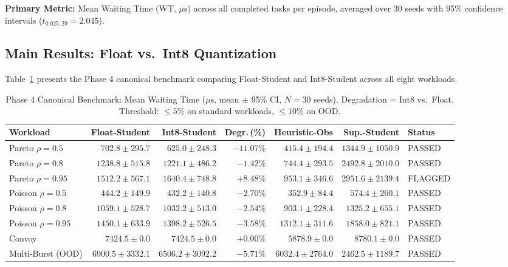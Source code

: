 \textbf{Primary Metric:} Mean Waiting Time (WT, $\mu\text{s}$) across all
completed tasks per episode, averaged over 30 seeds with 95\% confidence
intervals ($t_{0.025,29} = 2.045$).

\subsection{Main Results: Float vs.\ Int8 Quantization}
\label{subsec:main_results}

Table~\ref{tab:phase4} presents the Phase 4 canonical benchmark comparing
Float-Student and Int8-Student across all eight workloads.

\begin{table}[t]
  \centering
  \caption{Phase 4 Canonical Benchmark: Mean Waiting Time ($\mu\text{s}$,
    mean $\pm$ 95\% CI, $N = 30$ seeds). Degradation = Int8 vs.\ Float.
    Threshold: $\le 5\%$ on standard workloads, $\le 10\%$ on OOD.}
  \label{tab:phase4}
  \small
  \begin{tabular}{lrrrrrl}
    \toprule
    \textbf{Workload} & \textbf{Float-Student} & \textbf{Int8-Student}
      & \textbf{Degr.\,(\%)} & \textbf{Heuristic-Obs} & \textbf{Sup.-Student} & \textbf{Status} \\
    \midrule
    Pareto $\rho = 0.5$  & $702.8\pm295.7$   & $625.0\pm248.3$    & $-11.07\%$ & $415.4\pm194.4$   & $1344.9\pm1050.9$ & PASSED \\
    Pareto $\rho = 0.8$  & $1238.8\pm515.8$  & $1221.1\pm486.2$   & $-1.42\%$  & $744.4\pm293.5$   & $2492.8\pm2010.0$ & PASSED \\
    Pareto $\rho = 0.95$ & $1512.2\pm567.1$  & $1640.4\pm748.8$   & $+8.48\%$  & $953.1\pm346.6$   & $2951.6\pm2139.4$ & FLAGGED \\
    Poisson $\rho = 0.5$ & $444.2\pm149.9$   & $432.2\pm140.8$    & $-2.70\%$  & $352.9\pm84.4$    & $574.4\pm260.1$   & PASSED \\
    Poisson $\rho = 0.8$ & $1059.1\pm528.7$  & $1032.2\pm513.0$   & $-2.54\%$  & $903.1\pm228.4$   & $1325.2\pm655.1$  & PASSED \\
    Poisson $\rho = 0.95$& $1450.1\pm633.9$  & $1398.2\pm526.5$   & $-3.58\%$  & $1312.1\pm311.6$  & $1858.0\pm821.1$  & PASSED \\
    Convoy               & $7424.5\pm0.0$    & $7424.5\pm0.0$     & $+0.00\%$  & $5878.9\pm0.0$    & $8780.1\pm0.0$    & PASSED \\
    Multi-Burst (OOD)    & $6900.5\pm3332.1$ & $6506.2\pm3092.2$  & $-5.71\%$  & $6032.4\pm2764.0$ & $2462.5\pm1189.7$ & PASSED \\
    \bottomrule
  \end{tabular}
\end{table}

